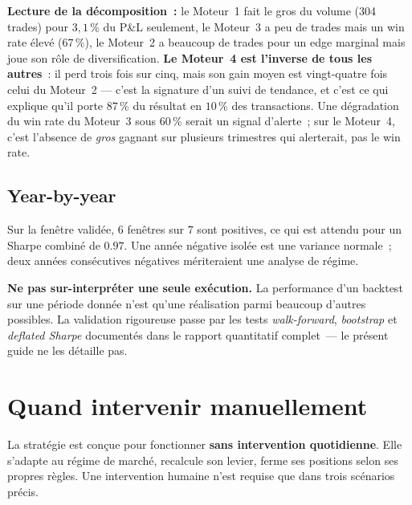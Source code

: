 \documentclass[11pt, a4paper]{scrartcl}
\begin{document}
\begin{insightbox}
\textbf{Lecture de la décomposition~:} le Moteur~1 fait le gros du volume (304
trades) pour $3{,}1\,\%$ du P\&L seulement, le Moteur~3 a peu de trades mais un win
rate élevé ($67\,\%$), le Moteur~2 a beaucoup de trades pour un edge marginal mais
joue son rôle de diversification. \textbf{Le Moteur~4 est l'inverse de tous les
autres}~: il perd trois fois sur cinq, mais son gain moyen est vingt-quatre fois celui
du Moteur~2 --- c'est la signature d'un suivi de tendance, et c'est ce qui explique
qu'il porte $87\,\%$ du résultat en $10\,\%$ des transactions. Une dégradation du
win rate du Moteur~3 sous $60\,\%$ serait un signal d'alerte~; sur le Moteur~4,
c'est l'absence de \emph{gros} gagnant sur plusieurs trimestres qui alerterait, pas
le win rate.
\end{insightbox}

\subsection{Year-by-year}

Sur la fenêtre validée, $6$ fenêtres sur $7$ sont positives, ce qui est attendu pour un Sharpe combiné de $0.97$. Une année négative isolée est une variance normale~; deux années consécutives négatives mériteraient une analyse de régime.

\begin{warningbox}
\textbf{Ne pas sur-interpréter une seule exécution.} La performance d'un
backtest sur une période donnée n'est qu'une réalisation parmi beaucoup
d'autres possibles. La validation rigoureuse passe par les tests \emph{walk-forward},
\emph{bootstrap} et \emph{deflated Sharpe} documentés dans le rapport
quantitatif complet~--- le présent guide ne les détaille pas.
\end{warningbox}


\section{Quand intervenir manuellement}
\label{sec:intervention}

La stratégie est conçue pour fonctionner \textbf{sans intervention quotidienne}. Elle s'adapte au régime de marché, recalcule son levier, ferme ses positions selon ses propres règles. Une intervention humaine n'est requise que dans trois scénarios précis.
\end{document}
